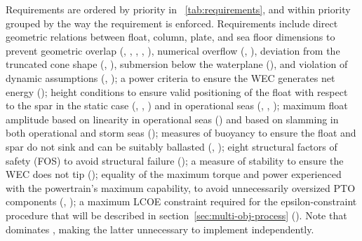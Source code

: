Requirements are ordered by priority in \tablename~\ref{tab:requirements}, and within priority grouped by the way the requirement is enforced.
Requirements include direct geometric relations between float, column, plate, and sea floor dimensions to prevent geometric overlap (, , , , ), numerical overflow (, ), deviation from the truncated cone shape (, ), submersion below the waterplane (), and violation of dynamic assumptions (, );
a power criteria to ensure the WEC generates net energy ();
height conditions to ensure valid positioning of the float with respect to the spar in the static case (, , ) and in operational seas (, , ); 
maximum float amplitude based on linearity in operational seas () and based on slamming in both operational and storm seas ();
measures of buoyancy to ensure the float and spar do not sink and can be suitably ballasted (, ); 
eight structural factors of safety (FOS) to avoid structural failure (); 
a measure of stability to ensure the WEC does not tip (); 
equality of the maximum torque and power experienced with the powertrain's maximum capability, to avoid unnecessarily oversized PTO components (, ); 
a maximum LCOE constraint required for the epsilon-constraint procedure that will be described in section~\ref{sec:multi-obj-process} (). Note that  dominates , making the latter unnecessary to implement independently.

